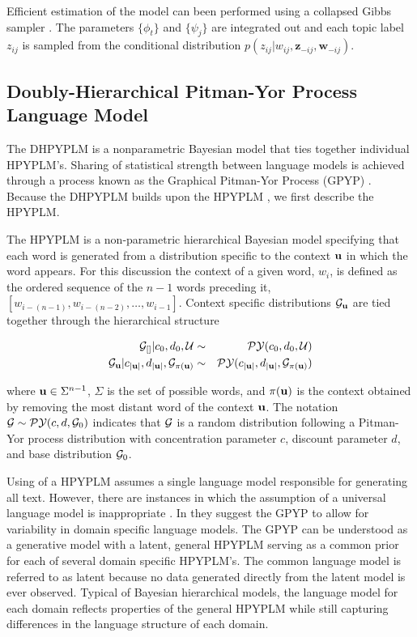 Efficient estimation of the model can been performed using a collapsed Gibbs sampler \cite{Griffiths2004}.  The parameters $\{ \phi_t \}$ and $\{ \psi_j \}$ are integrated out and each topic label $z_{ij}$ is sampled from the conditional distribution $p(z_{ij} | w_{ij}, \mathbf{z}_{-ij}, \mathbf{w}_{-ij})$.

\subsection{Doubly-Hierarchical Pitman-Yor Process Language Model}

The DHPYPLM is a nonparametric Bayesian model that ties together individual HPYPLM's. Sharing of statistical strength between language models is achieved through a process known as the Graphical Pitman-Yor Process (GPYP) \cite{wood and teh}.  Because the DHPYPLM builds upon the HPYPLM \cite{teh}, we first describe the HPYPLM.

The HPYPLM is a non-parametric hierarchical Bayesian model specifying that each word is generated from a distribution specific to the context ${\bf u}$ in which the word appears.  For this discussion the context of a given word, $w_i$, is  defined as the ordered sequence of the $n-1$ words preceding it, $[w_{i - (n-1)}, w_{i-(n-2)}, \ldots, w_{i-1}]$.  Context specific distributions $\G_{\bu}$ are tied together through the hierarchical structure

\begin{eqnarray}
\G_{[]}| c_0, d_0, \mathcal{U} &\sim& \PY(c_0, d_0, \mathcal{U}) \nonumber \\
\G_\bu | c_{|\bu|}, d_{|\bu|}, \G_{\pi (\bu)} &\sim& \PY( c_{|\bu|}, d_{|\bu|},  \G_{\pi (\bu)}) \label{eqn:hpyplm}
\end{eqnarray}

where $\bu \in \Sigma^{n-1}$, $\Sigma$ is the set of possible words, and $\pi(\bu)$ is the context obtained by removing the most distant word of the context $\bu$.  The notation $\G \sim \PY(c,d,\G_0)$ indicates that $\G$ is a random distribution following a Pitman-Yor process distribution  \cite{someone} with concentration parameter $c$, discount parameter $d$, and base distribution $\G_0$.

Using of a HPYPLM assumes a single language model responsible for generating all text.  However, there are instances in which the assumption of a universal language model is inappropriate \cite{Rosenfeld2000}.  In \cite{wood and teh} they suggest the GPYP to allow for variability in domain specific language models. The GPYP can be understood as a generative model with a latent, general HPYPLM serving as a common prior for each of several domain specific HPYPLM's.  The common language model is referred to as latent because no data generated directly from the latent model is ever observed.  Typical of Bayesian hierarchical models, the language model for each domain reflects properties of the general HPYPLM while still capturing differences in the language structure of each domain.  

